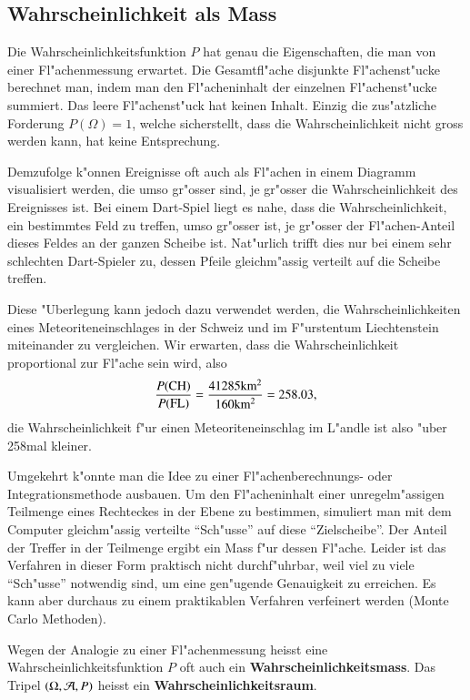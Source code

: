 \subsection{Wahrscheinlichkeit als Mass}
Die Wahrscheinlichkeitsfunktion $P$ hat genau die Eigenschaften,
die man von einer Fl"achenmessung erwartet. Die Gesamtfl"ache
disjunkte Fl"achenst"ucke berechnet man, indem man den Fl"acheninhalt
der einzelnen Fl"achenst"ucke summiert. Das leere Fl"achenst"uck
hat keinen Inhalt. Einzig die zus"atzliche Forderung $P(\Omega)=1$, welche
sicherstellt, dass die Wahrscheinlichkeit nicht gross werden kann,
hat keine Entsprechung.

Demzufolge k"onnen Ereignisse oft auch als Fl"achen in einem Diagramm
visualisiert werden,
die umso gr"osser sind, je gr"osser die Wahrscheinlichkeit des Ereignisses
ist. Bei einem Dart-Spiel liegt es nahe, dass die Wahrscheinlichkeit, ein
bestimmtes Feld zu treffen, umso gr"osser ist, je gr"osser der Fl"achen-Anteil
dieses Feldes an der ganzen Scheibe ist. Nat"urlich trifft dies nur bei einem
sehr schlechten Dart-Spieler zu, dessen Pfeile gleichm"assig verteilt auf
die Scheibe treffen.

Diese
"Uberlegung kann jedoch dazu verwendet werden, die Wahrscheinlichkeiten
eines Meteoriteneinschlages in der Schweiz und im F"urstentum Liechtenstein
miteinander zu vergleichen. Wir erwarten, dass die Wahrscheinlichkeit
proportional zur Fl"ache sein wird, also
\[
\frac{P(\text{CH})}{P(\text{FL})}=
\frac{41285\text{km$\mathstrut^2$}}{160\text{km$\mathstrut^2$}}
=258.03,
\]
die Wahrscheinlichkeit f"ur einen Meteoriteneinschlag im L"andle ist also
"uber 258mal kleiner.

Umgekehrt k"onnte man die Idee zu einer Fl"achenberechnungs- oder
Integra\-tions\-methode ausbauen. Um den Fl"acheninhalt einer unregelm"assigen
Teilmenge
eines Rechteckes in der Ebene zu bestimmen, simuliert man mit dem
Computer gleichm"assig verteilte ``Sch"usse'' auf diese ``Zielscheibe''.
Der Anteil der Treffer in der Teilmenge ergibt ein Mass f"ur dessen
Fl"ache. Leider ist das Verfahren in dieser Form praktisch nicht
durchf"uhrbar, weil viel zu viele ``Sch"usse'' notwendig sind, um
eine gen"ugende Genauigkeit zu erreichen. Es kann aber durchaus
zu einem praktikablen Verfahren verfeinert werden (Monte Carlo Methoden).

Wegen
der Analogie zu einer Fl"achenmessung heisst eine
Wahrscheinlichkeitsfunktion $P$ oft auch ein {\bf Wahrscheinlichkeitsmass}. Das
Tripel $(\Omega,{\cal A}, P)$ heisst ein {\bf Wahrscheinlichkeitsraum}.

